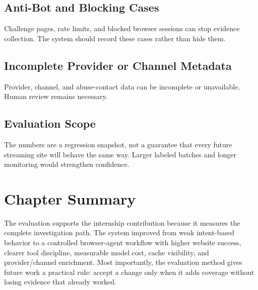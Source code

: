 \subsection{Anti-Bot and Blocking Cases}

Challenge pages, rate limits, and blocked browser sessions can stop evidence
collection. The system should record these cases rather than hide them.

\subsection{Incomplete Provider or Channel Metadata}

Provider, channel, and abuse-contact data can be incomplete or unavailable.
Human review remains necessary.

\subsection{Evaluation Scope}

The numbers are a regression snapshot, not a guarantee that every future
streaming site will behave the same way. Larger labeled batches and longer
monitoring would strengthen confidence.

\section{Chapter Summary}

The evaluation supports the internship contribution because it measures the
complete investigation path. The system improved from weak intent-based
behavior to a controlled browser-agent workflow with higher website success,
clearer tool discipline, measurable model cost, cache visibility, and
provider/channel enrichment. Most importantly, the evaluation method gives
future work a practical rule: accept a change only when it adds coverage
without losing evidence that already worked.
